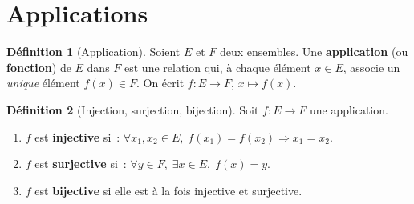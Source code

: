 \documentclass[12pt,a4paper,openany]{book}
\theoremstyle{definition}
\newtheorem{definition}{Définition}[chapter]
\begin{document}
\section{Applications}
\label{sec:applications}

\begin{definition}[Application]\label{def:application}
  Soient $E$ et $F$ deux ensembles. Une \textbf{application} (ou \textbf{fonction}) de $E$ dans $F$ est une relation qui, à chaque élément $x \in E$, associe un \emph{unique} élément $f(x) \in F$. On écrit $f : E \to F$, $x \mapsto f(x)$.
\end{definition}

\begin{definition}[Injection, surjection, bijection]\label{def:inj-surj-bij}
  Soit $f : E \to F$ une application.
  \begin{enumerate}[label=(\roman*)]
    \item $f$ est \textbf{injective} si~: $\forall x_1, x_2 \in E,\; f(x_1) = f(x_2) \Rightarrow x_1 = x_2$.
    \item $f$ est \textbf{surjective} si~: $\forall y \in F,\; \exists x \in E,\; f(x) = y$.
    \item $f$ est \textbf{bijective} si elle est à la fois injective et surjective.
  \end{enumerate}
\end{definition}
\end{document}
